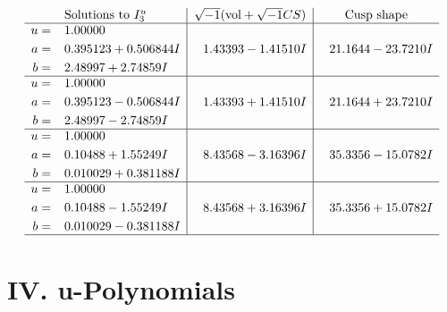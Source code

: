 \documentclass[1p]{elsarticle_modified}
\theoremstyle{definition}
\newcommand{\I}{\sqrt{-1}}
\begin{document}
$$\begin{array}{c|c|c}  
\text{Solutions to }I^u_{3}& \I (\text{vol} + \sqrt{-1}CS) & \text{Cusp shape}\\
 \hline 
\begin{aligned}
u &= \phantom{-}1.00000\phantom{ +0.000000I} \\
a &= \phantom{-}0.395123 + 0.506844 I \\
b &= \phantom{-}2.48997 + 2.74859 I\end{aligned}
 & \phantom{-}1.43393 - 1.41510 I & \phantom{-}21.1644 - 23.7210 I \\ \hline\begin{aligned}
u &= \phantom{-}1.00000\phantom{ +0.000000I} \\
a &= \phantom{-}0.395123 - 0.506844 I \\
b &= \phantom{-}2.48997 - 2.74859 I\end{aligned}
 & \phantom{-}1.43393 + 1.41510 I & \phantom{-}21.1644 + 23.7210 I \\ \hline\begin{aligned}
u &= \phantom{-}1.00000\phantom{ +0.000000I} \\
a &= \phantom{-}0.10488 + 1.55249 I \\
b &= \phantom{-}0.010029 + 0.381188 I\end{aligned}
 & \phantom{-}8.43568 - 3.16396 I & \phantom{-}35.3356 - 15.0782 I \\ \hline\begin{aligned}
u &= \phantom{-}1.00000\phantom{ +0.000000I} \\
a &= \phantom{-}0.10488 - 1.55249 I \\
b &= \phantom{-}0.010029 - 0.381188 I\end{aligned}
 & \phantom{-}8.43568 + 3.16396 I & \phantom{-}35.3356 + 15.0782 I\\
 \hline 
 \end{array}$$\newpage
\newpage\renewcommand{\arraystretch}{1}
\centering \section*{ IV. u-Polynomials}
\end{document}
